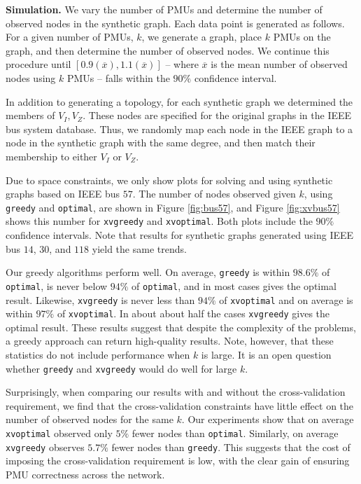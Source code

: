 
\textbf{Simulation.}
We vary the number of PMUs and determine the number of observed nodes in the synthetic graph. 
Each data point is generated as follows. For a given number of PMUs, $k$, we generate a graph, place $k$ PMUs on the graph, and then determine the number of observed nodes. 
We continue this procedure until $[0.9(\overline{x}),1.1(\overline{x})]$ -- where $\overline{x}$ is the mean number of observed nodes using $k$ PMUs -- falls within the $90\%$ confidence interval.

In addition to generating a topology, for each synthetic graph we determined the members of $V_I, V_Z$. These nodes are specified for the original graphs in the IEEE bus system database. Thus, 
we randomly map each node in the IEEE graph to a node in the synthetic graph with the same degree, and then match their membership to either $V_I$ or $V_Z$.

Due to space constraints, we only show plots for solving \maxinc and \xvalpart using synthetic graphs based on IEEE bus $57$.  
The number of nodes observed given $k$, using {\tt greedy} and {\tt optimal}, are shown in Figure \ref{fig:bus57}, and Figure \ref{fig:xvbus57} shows this number 
for {\tt xvgreedy} and {\tt xvoptimal}.  Both plots include the $90\%$ confidence intervals. 
Note that results for synthetic graphs generated using IEEE bus $14$, $30$, and $118$ yield the same trends.

Our greedy algorithms perform well. On average, {\tt greedy} is within $98.6\%$ of {\tt optimal},
is never below $94\%$ of {\tt optimal}, and in most cases gives the optimal result.
Likewise, {\tt xvgreedy} is never less than $94 \%$ of {\tt xvoptimal} and on average is within $97\%$ of {\tt xvoptimal}. In about about half the cases {\tt xvgreedy} gives the optimal result.
These results suggest that despite the complexity of the problems, a greedy approach can return high-quality results. Note, however, that these statistics do not include performance when
$k$ is large.  It is an open question whether {\tt greedy} and {\tt xvgreedy} would do well for large $k$. 

Surprisingly, when comparing our results with and without the cross-validation requirement, we find that the cross-validation constraints have little effect on the number of observed nodes 
for the same $k$. Our experiments show that on average {\tt xvoptimal} observed only $5\%$ fewer nodes than {\tt optimal}.  Similarly, on average {\tt xvgreedy} observes
 $5.7\%$ fewer nodes than {\tt greedy}. This suggests that the cost of imposing the cross-validation requirement is low, with the clear gain of ensuring PMU correctness across the network.


